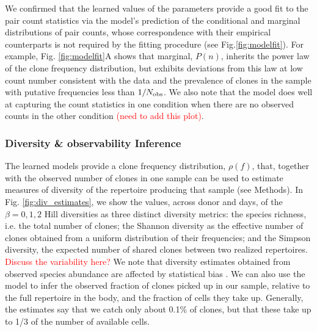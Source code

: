 \documentclass[letterpaper,english,prl,reprint,longbibliography]{revtex4-1} %
\begin{document}
We confirmed that the learned values of the parameters provide a good fit to the pair count statistics via the model's prediction of the conditional and marginal distributions of pair counts, whose correspondence with their empirical counterparts is not required by the fitting procedure (see Fig.\ref{fig:modelfit}). For example, Fig. \ref{fig:modelfit}A shows that marginal, $P(n)$, inherits the power law of the clone frequency distribution, but exhibits deviations from this law at low count number consistent with the data and the prevalence of clones in the sample with putative frequencies less than $1/N_{\textrm{\textrm{obs}}}$. We also note that the model does well at capturing the count statistics in one condition when there are no observed counts in the other condition \textcolor{red}{(need to add this plot)}.

\subsubsection*{Diversity \& observability Inference}
The learned models provide a clone frequency distribution, $\rho(f)$, that, together with the observed number of clones in one sample can be used to estimate measures of diversity of the repertoire producing that sample (see Methods). In Fig. \ref{fig:div_estimates}, we show the values, across donor and days, of the $\beta=0,1,2$ Hill diversities as three distinct diversity metrics: the species richness, i.e. the total number of clones; the Shannon diversity as the effective number of clones obtained from a uniform distribution of their frequencies; and the Simpson diversity, the expected number of shared clones between two realized repertoires. \textcolor{red}{Discuss the variability here?} We note that diversity estimates obtained from observed species abundance are affected by statistical bias \citep{Mora2016}.
We can also use the model to infer the observed fraction of clones picked up in our sample, relative to the full repertoire in the body, and the fraction of cells they take up. Generally, the estimates say that we catch only about 0.1\% of clones, but that these take up to 1/3 of the number of available cells.
\end{document}
